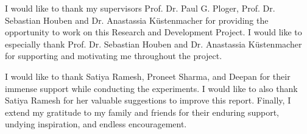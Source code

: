 




    \begin{acknowledgements}
        I would like to thank my supervisors Prof. Dr. Paul G. Ploger, Prof. Dr. Sebastian Houben and Dr. Anastassia K{\"u}stenmacher for providing the opportunity to work on this Research and Development Project. I would like to especially thank Prof. Dr. Sebastian Houben and Dr. Anastassia K{\"u}stenmacher  for supporting and
        motivating me throughout the project. 
        
        I would like to thank Satiya Ramesh, Proneet Sharma, and
        Deepan  for their immense support while conducting the experiments. I
        would like to also thank Satiya Ramesh for her valuable
        suggestions to improve this report.
        Finally, I extend my gratitude to my family and friends for their enduring support,
        undying inspiration, and endless encouragement.
    \end{acknowledgements}

